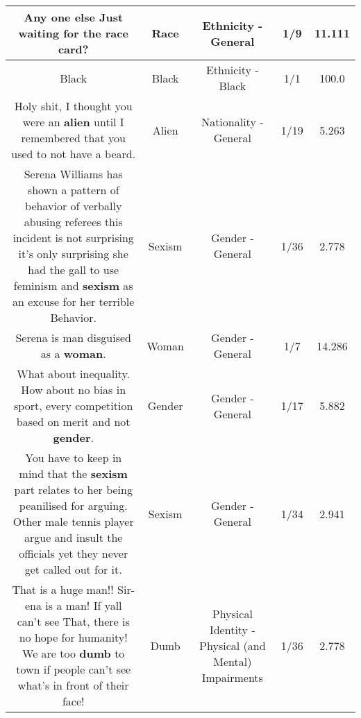 \documentclass[11pt]{article}
\newlength\mylength
\begin{document}
\begin{center}
\begin{longtable}{|C{.65\mylength}|C{.30\mylength}|C{.12\mylength}|C{.12\mylength}|C{.12\mylength}|}
  \small Any one else Just waiting for the \textbf{race} card?\normalsize   & Race & Ethnicity - General & 1/9 & 11.111 \\  \hline
  \small Black\normalsize   & Black & Ethnicity - Black & 1/1 & 100.0 \\  \hline
  \small Holy shit, I thought you were an \textbf{alien} until I remembered that you used to not have a beard.\normalsize   & Alien & Nationality - General & 1/19 & 5.263 \\  \hline
  \small Serena Williams has shown a pattern of behavior of verbally abusing referees this incident is not surprising it's only surprising she had the gall to use feminism and \textbf{sexism} as an excuse for her terrible Behavior.\normalsize   & Sexism & Gender - General & 1/36 & 2.778 \\  \hline
  \small Serena is man disguised as a \textbf{woman}.\normalsize   & Woman & Gender - General & 1/7 & 14.286 \\  \hline
  \small What about inequality. How about no bias in sport, every competition based on merit and not \textbf{gender}.\normalsize   & Gender & Gender - General & 1/17 & 5.882 \\  \hline
  \small You have to keep in mind that the \textbf{sexism} part relates to her being peanilised for arguing. Other male tennis player argue and insult the officials yet they never get called out for it.\normalsize   & Sexism & Gender - General & 1/34 & 2.941 \\  \hline
  \small That is a huge man!! Sir-ena is a man! If yall can't see That, there is no hope for humanity! We are too \textbf{dumb} to town if people can't see what's in front of their face!\normalsize   & Dumb & Physical Identity - Physical (and Mental) Impairments & 1/36 & 2.778 \\  \hline

\end{longtable}
\end{center}
\end{document}
